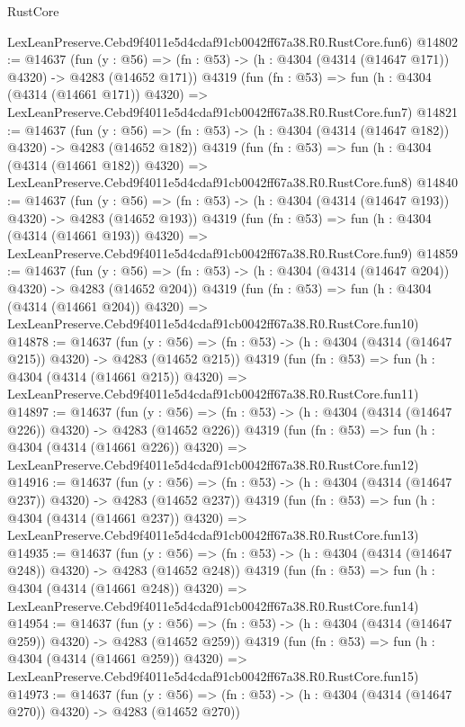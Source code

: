 \begin{lexlean}{RustCore}
\begin{coremodule}
    LexLeanPreserve.Cebd9f4011e5d4cdaf91cb0042ff67a38.R0.RustCore.fun6)
@14802 := @14637
    (fun (y : @56) => (fn : @53) -> (h : @4304 (@4314 (@14647 @171)) @4320) -> @4283 (@14652 @171))
    @4319
    (fun (fn : @53) =>
    fun (h : @4304 (@4314 (@14661 @171)) @4320) =>
    LexLeanPreserve.Cebd9f4011e5d4cdaf91cb0042ff67a38.R0.RustCore.fun7)
@14821 := @14637
    (fun (y : @56) => (fn : @53) -> (h : @4304 (@4314 (@14647 @182)) @4320) -> @4283 (@14652 @182))
    @4319
    (fun (fn : @53) =>
    fun (h : @4304 (@4314 (@14661 @182)) @4320) =>
    LexLeanPreserve.Cebd9f4011e5d4cdaf91cb0042ff67a38.R0.RustCore.fun8)
@14840 := @14637
    (fun (y : @56) => (fn : @53) -> (h : @4304 (@4314 (@14647 @193)) @4320) -> @4283 (@14652 @193))
    @4319
    (fun (fn : @53) =>
    fun (h : @4304 (@4314 (@14661 @193)) @4320) =>
    LexLeanPreserve.Cebd9f4011e5d4cdaf91cb0042ff67a38.R0.RustCore.fun9)
@14859 := @14637
    (fun (y : @56) => (fn : @53) -> (h : @4304 (@4314 (@14647 @204)) @4320) -> @4283 (@14652 @204))
    @4319
    (fun (fn : @53) =>
    fun (h : @4304 (@4314 (@14661 @204)) @4320) =>
    LexLeanPreserve.Cebd9f4011e5d4cdaf91cb0042ff67a38.R0.RustCore.fun10)
@14878 := @14637
    (fun (y : @56) => (fn : @53) -> (h : @4304 (@4314 (@14647 @215)) @4320) -> @4283 (@14652 @215))
    @4319
    (fun (fn : @53) =>
    fun (h : @4304 (@4314 (@14661 @215)) @4320) =>
    LexLeanPreserve.Cebd9f4011e5d4cdaf91cb0042ff67a38.R0.RustCore.fun11)
@14897 := @14637
    (fun (y : @56) => (fn : @53) -> (h : @4304 (@4314 (@14647 @226)) @4320) -> @4283 (@14652 @226))
    @4319
    (fun (fn : @53) =>
    fun (h : @4304 (@4314 (@14661 @226)) @4320) =>
    LexLeanPreserve.Cebd9f4011e5d4cdaf91cb0042ff67a38.R0.RustCore.fun12)
@14916 := @14637
    (fun (y : @56) => (fn : @53) -> (h : @4304 (@4314 (@14647 @237)) @4320) -> @4283 (@14652 @237))
    @4319
    (fun (fn : @53) =>
    fun (h : @4304 (@4314 (@14661 @237)) @4320) =>
    LexLeanPreserve.Cebd9f4011e5d4cdaf91cb0042ff67a38.R0.RustCore.fun13)
@14935 := @14637
    (fun (y : @56) => (fn : @53) -> (h : @4304 (@4314 (@14647 @248)) @4320) -> @4283 (@14652 @248))
    @4319
    (fun (fn : @53) =>
    fun (h : @4304 (@4314 (@14661 @248)) @4320) =>
    LexLeanPreserve.Cebd9f4011e5d4cdaf91cb0042ff67a38.R0.RustCore.fun14)
@14954 := @14637
    (fun (y : @56) => (fn : @53) -> (h : @4304 (@4314 (@14647 @259)) @4320) -> @4283 (@14652 @259))
    @4319
    (fun (fn : @53) =>
    fun (h : @4304 (@4314 (@14661 @259)) @4320) =>
    LexLeanPreserve.Cebd9f4011e5d4cdaf91cb0042ff67a38.R0.RustCore.fun15)
@14973 := @14637
    (fun (y : @56) => (fn : @53) -> (h : @4304 (@4314 (@14647 @270)) @4320) -> @4283 (@14652 @270))

\end{coremodule}
\end{lexlean}
